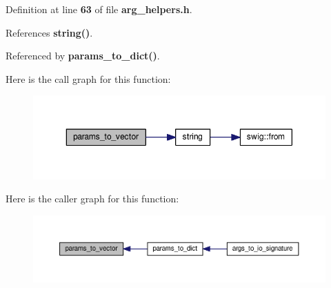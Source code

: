 Definition at line {\bf 63} of file {\bf arg\+\_\+helpers.\+h}.



References {\bf string()}.



Referenced by {\bf params\+\_\+to\+\_\+dict()}.



Here is the call graph for this function\+:
\nopagebreak
\begin{figure}[H]
\begin{center}
\leavevmode
\includegraphics[width=350pt]{d9/d9a/arg__helpers_8h_a1748d0a856bdfe9f0db3bbf0d555eaf0_cgraph}
\end{center}
\end{figure}




Here is the caller graph for this function\+:
\nopagebreak
\begin{figure}[H]
\begin{center}
\leavevmode
\includegraphics[width=350pt]{d9/d9a/arg__helpers_8h_a1748d0a856bdfe9f0db3bbf0d555eaf0_icgraph}
\end{center}
\end{figure}


